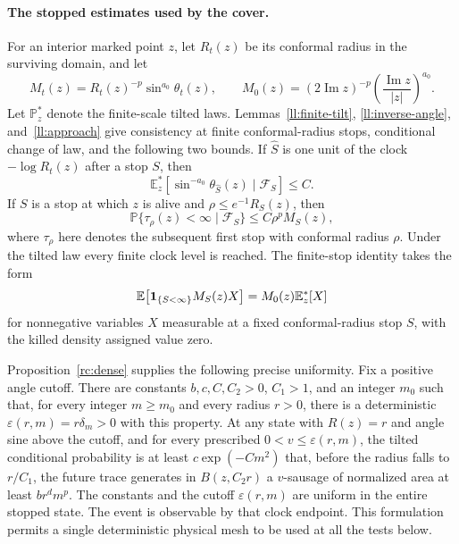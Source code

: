 \documentclass[11pt]{article}
\theoremstyle{definition}
\theoremstyle{remark}
\numberwithin{equation}{section}
\begin{document}
\paragraph{The stopped estimates used by the cover.}
For an interior marked point \(z\), let \(R_t(z)\) be its conformal
radius in the surviving domain, and let
\[
 M_t(z)=R_t(z)^{-p}\sin^{a_0}\theta_t(z),\qquad
 M_0(z)=(2\operatorname{Im}z)^{-p}
        \left(\frac{\operatorname{Im}z}{|z|}\right)^{a_0}.
\]
Let \(\mathbb P_z^*\) denote the finite-scale tilted laws.  Lemmas~\ref{ll:finite-tilt}, \ref{ll:inverse-angle}, and~\ref{ll:approach}
give consistency at finite conformal-radius stops, conditional change
of law, and the following two bounds.
If \(\widehat S\) is one unit of the clock \(-\log R_t(z)\)
after a stop \(S\), then
\begin{equation}
 \mathbb E_z^*\!\left[
      \sin^{-a_0}\theta_{\widehat S}(z)\mid\mathcal F_S\right]\le C.
 \label{eq:cover-angle}
\end{equation}
If \(S\) is a stop at which \(z\) is alive and
\(\rho\le e^{-1}R_S(z)\), then
\begin{equation}
 \mathbb P\{\tau_\rho(z)<\infty\mid\mathcal F_S\}
      \le C\rho^p M_S(z),
 \label{eq:cover-one-point}
\end{equation}
where \(\tau_\rho\) here denotes the subsequent first stop with
conformal radius \(\rho\).  Under the tilted law every finite clock
level is reached.  The finite-stop identity takes the form
\begin{equation}
 \mathbb E\!\left[
       {\bf1}_{\{S<\infty\}}M_S(z)X\right]
        =M_0(z)\mathbb E_z^*[X]
 \label{eq:cover-finite-tilt}
\end{equation}
for nonnegative variables \(X\) measurable at a fixed conformal-radius
stop \(S\), with the killed density assigned value zero.

Proposition~\ref{rc:dense} supplies the following precise uniformity.  Fix a
positive angle cutoff.  There are constants \(b,c,C,C_2>0\), \(C_1>1\),
and an integer \(m_0\) such that, for every integer \(m\ge m_0\)
and every radius \(r>0\), there is a deterministic
\(\varepsilon(r,m)=r\delta_m>0\) with this property.  At any state with
\(R(z)=r\) and angle sine above the cutoff, and for every prescribed
\(0<v\le\varepsilon(r,m)\), the tilted conditional probability is
at least \(c\exp(-Cm^2)\) that, before the radius falls to
\(r/C_1\), the future trace generates in \(B(z,C_2r)\) a
\(v\)-sausage of normalized area at least \(b r^d m^p\).
The constants and the cutoff \(\varepsilon(r,m)\) are uniform in
the entire stopped state.  The event is observable by that clock
endpoint.  This formulation permits a single deterministic physical
mesh to be used at all the tests below.
\end{document}
